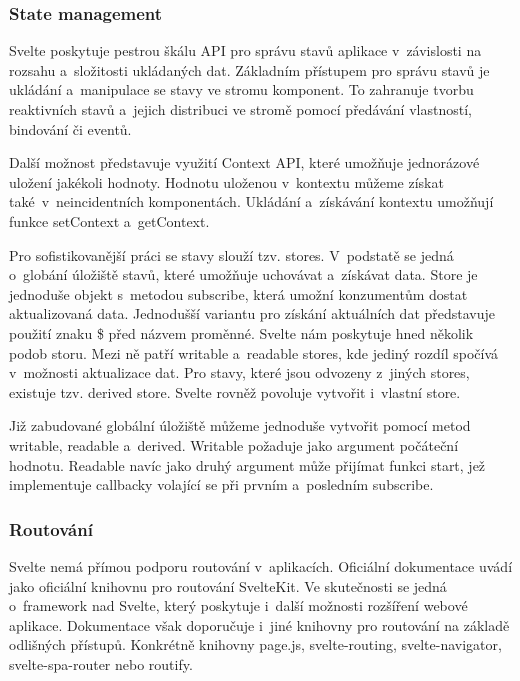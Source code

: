 \subsubsection{State management}

Svelte poskytuje pestrou škálu API pro správu stavů aplikace v~závislosti na rozsahu a~složitosti ukládaných dat. 
Základním přístupem pro správu stavů je ukládání a~manipulace se stavy ve stromu komponent. 
To zahranuje tvorbu reaktivních stavů a~jejich distribuci ve stromě pomocí předávání vlastností, bindování či eventů. 

Další možnost představuje využití Context API, které umožňuje jednorázové uložení jakékoli hodnoty. 
Hodnotu uloženou v~kontextu můžeme získat také~v~neincidentních komponentách. Ukládání a~získávání kontextu umožňují funkce setContext a~getContext.

Pro sofistikovanější práci se stavy slouží tzv. stores. V~podstatě se jedná o~globání úložiště stavů, které umožňuje uchovávat a~získávat data. 
Store je jednoduše objekt s~metodou subscribe, která umožní konzumentům dostat aktualizovaná data. 
Jednodušší variantu pro získání aktuálních dat představuje použití znaku \$ před názvem proměnné. Svelte nám poskytuje hned několik podob storu. 
Mezi ně patří writable a~readable stores, kde jediný rozdíl spočívá v~možnosti aktualizace dat. 
Pro stavy, které jsou odvozeny z~jiných stores, existuje tzv. derived store. Svelte rovněž povoluje vytvořit i~vlastní store. 

Již zabudované globální úložiště můžeme jednoduše vytvořit pomocí metod writable, readable a~derived. Writable požaduje jako argument počáteční hodnotu. 
Readable navíc jako druhý argument může přijímat funkci start, jež implementuje callbacky volající se při prvním a~posledním subscribe.\cite{sveltehandbook,svelte,sveltestatemanagement}

\subsubsection{Routování}

Svelte nemá přímou podporu routování v~aplikacích. Oficiální dokumentace uvádí jako oficiální knihovnu pro routování SvelteKit. 
Ve skutečnosti se jedná o~framework nad Svelte, který poskytuje i~další možnosti rozšíření webové aplikace. 
Dokumentace však doporučuje i~jiné knihovny pro routování na základě odlišných přístupů. 
Konkrétně knihovny page.js, svelte-routing, svelte-navigator, svelte-spa-router nebo routify.\cite{svelte,svelteforbeginners}

